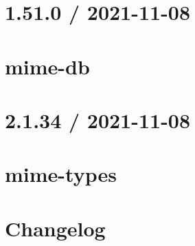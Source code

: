 \documentclass[twoside]{book}
\newcommand{\+}{\discretionary{\mbox{\scriptsize$\hookleftarrow$}}{}{}}
\begin{document}
\chapter{1.51.0 / 2021-\/11-\/08}
\label{md__c___users_vaishnavi_jadhav__desktop__developer_code_mean_stack_example_client_node_modules_mime_db__h_i_s_t_o_r_y}

\chapter{mime-\/db}
\label{md__c___users_vaishnavi_jadhav__desktop__developer_code_mean_stack_example_client_node_modules_mime_db__r_e_a_d_m_e}

\chapter{2.1.34 / 2021-\/11-\/08}
\label{md__c___users_vaishnavi_jadhav__desktop__developer_code_mean_stack_example_client_node_modules_mime_types__h_i_s_t_o_r_y}

\chapter{mime-\/types}
\label{md__c___users_vaishnavi_jadhav__desktop__developer_code_mean_stack_example_client_node_modules_mime_types__r_e_a_d_m_e}

\chapter{Changelog}
\label{md__c___users_vaishnavi_jadhav__desktop__developer_code_mean_stack_example_client_node_modules_mime__c_h_a_n_g_e_l_o_g}

\end{document}

